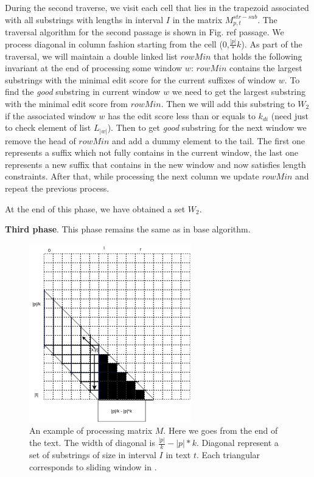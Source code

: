During the second traverse, we visit each cell that lies in the trapezoid associated with all substrings with lengths in interval $I$ in  the matrix $M^{str-sub}_{p,t}$.
The traversal algorithm for the second passage is shown in Fig.  ref {passage}.
We process diagonal in column fashion starting from the cell (0,$\frac{|p|}*k$).
As part of the traversal, we will maintain a  double linked list $rowMin$ that holds the following invariant at the end of processing some window $w$: 
$rowMin$ contains the largest substrings with the minimal edit score for the current suffixes of window $w$.
To find the  \emph{good} substring in current window $w$ we need to get the largest substring with the minimal edit score from $rowMin$. Then we will add this substring to $W_{2}$ if the associated window $w$ has the edit score less than or equals to $k_{di}$ (need just to check element of list $L_{|w|}$).
Then to get \emph{good} substring for the next window we remove the head of $rowMin$ and add a dummy element to the tail.
The first one represents a suffix which not fully contains in the current window,  the last one represents a new suffix that contains in the new window and now satisfies length constraints. 
After that, while processing the next column we update $rowMin$ and repeat the previous process. 

At the end of this phase, we have obtained a set $W_2$.

\textbf{Third phase}. 
This phase remains the same as in base algorithm.
 
\begin{figure}
	\centering
   \includegraphics[width=0.4\columnwidth]{figures/M2.png}
   \caption{An example of processing matrix $M$.
   Here we goes from the end of the text. The width of diagonal is $\frac{|p|}{k} - |p|*k$.
Diagonal represent a set of substrings  of size in interval $I$ in text $t$.
Each triangular corresponds to sliding window in \cite{luciv2019interactive}.   
   }\label{M2}
\end{figure}




